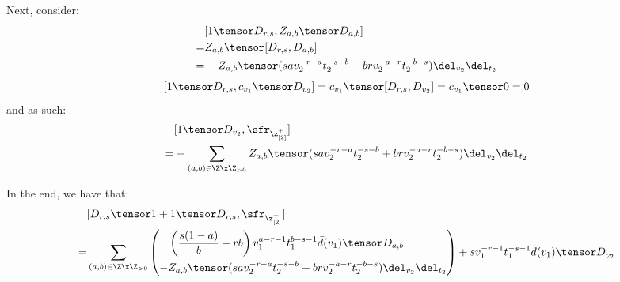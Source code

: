 \begin{enumerate}
\begin{enumerate}
                            Next, consider:
                                $$
                                    \begin{aligned}
                                        & [1 \tensor D_{r, s}, Z_{a, b} \tensor D_{a, b}]
                                        \\
                                        = & Z_{a, b} \tensor [D_{r, s}, D_{a, b}]
                                        \\
                                        = & -Z_{a, b} \tensor ( s a v_2^{-r - a} t_2^{-s - b} + b r v_2^{-a - r} t_2^{-b - s} ) \del_{v_2} \del_{t_2}
                                    \end{aligned}
                                $$
                                $$[1 \tensor D_{r, s}, c_{v_1} \tensor D_{v_2}] = c_{v_1} \tensor [D_{r, s}, D_{v_2}] = c_{v_1} \tensor 0 = 0$$
                            and as such:
                                $$
                                    \begin{aligned}
                                        & [1 \tensor D_{v_2}, \sfr_{\z_{[2]}^+}]
                                        \\
                                        = & -\sum_{(a, b) \in \Z \x \Z_{> 0}} Z_{a, b} \tensor ( s a v_2^{-r - a} t_2^{-s - b} + b r v_2^{-a - r} t_2^{-b - s} ) \del_{v_2} \del_{t_2}
                                    \end{aligned}
                                $$

                            In the end, we have that:
                                $$
                                    \begin{aligned}
                                        & [D_{r, s} \tensor 1 + 1 \tensor D_{r, s}, \sfr_{\z_{[2]}^+}]
                                        \\
                                        = & \sum_{(a, b) \in \Z \x \Z_{> 0}} \left(
                                        \begin{aligned}
                                            & \left( \frac{s(1 - a)}{b} + rb  \right) v_1^{a - r - 1} t_1^{b - s - 1} \bar{d}(v_1) \tensor D_{a, b}
                                            \\
                                            - & Z_{a, b} \tensor ( s a v_2^{-r - a} t_2^{-s - b} + b r v_2^{-a - r} t_2^{-b - s} ) \del_{v_2} \del_{t_2}
                                        \end{aligned} 
                                        \right)
                                        + s v_1^{-r - 1} t_1^{-s - 1} \bar{d}(v_1) \tensor D_{v_2}
                                    \end{aligned}
                                $$
                            

\end{enumerate}
\end{enumerate}
